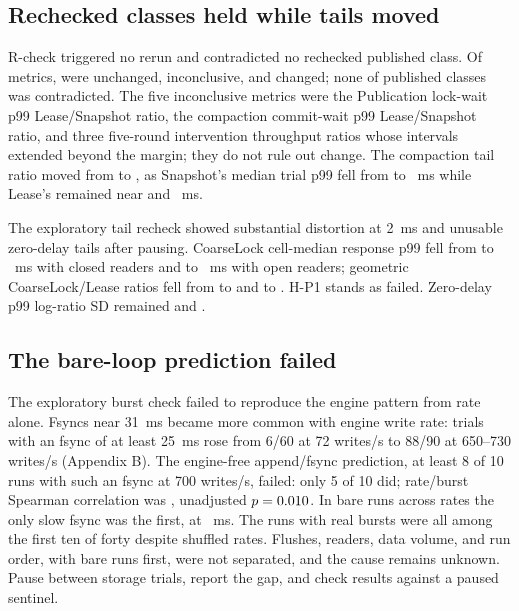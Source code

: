 \documentclass[conference]{IEEEtran}
\begin{document}
\subsection{Rechecked classes held while tails moved}
R-check triggered no rerun and contradicted no rechecked published class. Of \SettledSentinelTotal{} metrics, \SettledSentinelUnchanged{} were unchanged, \SettledSentinelInconclusive{} inconclusive, and \SettledSentinelChanged{} changed; none of \SettledPublishedClasses{} published classes was contradicted. The five inconclusive metrics were the Publication lock-wait p99 Lease/Snapshot ratio, the compaction commit-wait p99 Lease/Snapshot ratio, and three five-round intervention throughput ratios whose intervals extended beyond the margin; they do not rule out change. The compaction tail ratio moved from \SettledCOneTailOld{} to \SettledCOneTailNew{}, as Snapshot's median trial p99 fell from \SettledCOneSnapshotOld{} to \SettledCOneSnapshotNew{}~ms while Lease's remained near \SettledCOneLeaseOld{} and \SettledCOneLeaseNew{}~ms.

The exploratory tail recheck showed substantial distortion at 2~ms and unusable zero-delay tails after pausing. CoarseLock cell-median response p99 fell from \SettledTailCLClosedOld{} to \SettledTailCLClosedNew{}~ms with closed readers and \SettledTailCLOpenOld{} to \SettledTailCLOpenNew{}~ms with open readers; geometric CoarseLock/Lease ratios fell from \SettledTailRatioClosedOld{} to \SettledTailRatioClosedNew{} and \SettledTailRatioOpenOld{} to \SettledTailRatioOpenNew{}. H-P1 stands as failed. Zero-delay p99 log-ratio SD remained \SettledTailSDZeroClosed{} and \SettledTailSDZeroOpen{}.

\subsection{The bare-loop prediction failed}
The exploratory burst check failed to reproduce the engine pattern from rate alone. Fsyncs near 31~ms became more common with engine write rate: trials with an fsync of at least 25~ms rose from 6/60 at 72 writes/s to 88/90 at 650--730 writes/s (Appendix B). The engine-free append/fsync prediction, at least 8 of 10 runs with such an fsync at 700 writes/s, failed: only 5 of 10 did; rate/burst Spearman correlation was \BareSpearman{}, unadjusted $p=0.010$. In \BareFirstSlowCount{} bare runs across rates the only slow fsync was the first, at \BareFirstSlow{}~ms. The \BareBurstRuns{} runs with real bursts were all among the first ten of forty despite shuffled rates. Flushes, readers, data volume, and run order, with bare runs first, were not separated, and the cause remains unknown. Pause between storage trials, report the gap, and check results against a paused sentinel.
\end{document}
